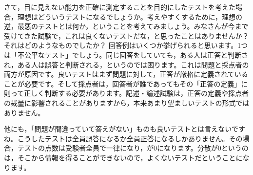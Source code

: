 \documentclass{ltjbook}
\begin{document}
さて，目に見えない能力を正確に測定することを目的にしたテストを考えた場合，理想はどういうテストになるでしょうか。考えやすくするために，理想の逆，最悪のテストとは何か，ということを考えてみましょう。みなさんが今まで受けてきた試験で，これは良くないテストだな，と思ったことはありませんか？ それはどのようなものでしたか？
回答例はいくつか挙げられると思います。1つは「不公平なテスト」でしょう。同じ回答をしていても，ある人は正答と判断され，ある人は誤答と判断される，というのでは困ります。これは問題と採点者の両方が原因です。良いテストはまず問題に対して，正答が厳格に定義されていることが必要です。そして採点者は，回答者が誰であってもその「正答の定義」に則って正しく判断する必要があります。記述・論述試験は，正答の定義や採点者の裁量に影響されることがありますから，本来あまり望ましいテストの形式ではありません。

他にも，「問題が間違っていて答えがない」ものも良いテストとは言えないですね。こうしたテストは全員誤答になるか全員正答になるしかありません。その場合，テストの点数は受験者全員で一律になり，が$0$になります。分散が$0$というのは，そこから情報を得ることができないので，よくないテストだということになります。
\end{document}
